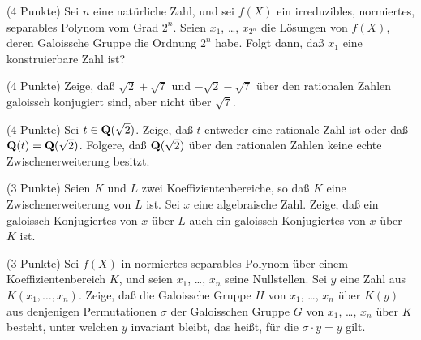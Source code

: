 \documentclass{algsheet}
\begin{document}
\begin{exercise}(4 Punkte)\newline
    Sei \(n\) eine natürliche Zahl,
    und sei \(f(X)\) ein irreduzibles, normiertes, separables Polynom vom Grad \(2^n\).
    Seien \(x_1\), \dots, \(x_{2^n}\) die Lösungen von \(f(X)\), deren
    Galoissche Gruppe die Ordnung \(2^n\) habe. Folgt dann, daß \(x_1\) eine konstruierbare
    Zahl ist?
\end{exercise}






\begin{exercise}(4 Punkte)\newline
    Zeige, daß \(\sqrt 2 + \sqrt 7\) und \(- \sqrt 2 - \sqrt 7\) über den rationalen Zahlen galoissch konjugiert
    sind, aber nicht über \(\sqrt 7\).
\end{exercise}

\begin{exercise}(4 Punkte)\newline
    Sei \(t \in \mathbf Q(\sqrt 2)\). Zeige, daß \(t\) entweder eine rationale
    Zahl ist oder daß \(\mathbf Q(t) = \mathbf Q(\sqrt 2)\). Folgere, daß \(\mathbf Q(\sqrt 2)\)
    über den rationalen Zahlen keine echte Zwischenerweiterung besitzt.
\end{exercise}

\begin{exercise}(3 Punkte)\newline
    Seien \(K\) und \(L\) zwei Koeffizientenbereiche, so daß \(K\) eine Zwischenerweiterung
    von \(L\) ist. Sei \(x\) eine algebraische Zahl. Zeige, daß ein galoissch Konjugiertes
    von \(x\) über \(L\) auch ein galoissch Konjugiertes von \(x\) über \(K\)
    ist.
\end{exercise}

\begin{exercise}(3 Punkte)\newline
    Sei \(f(X)\) in normiertes separables Polynom über einem Koeffizientenbereich \(K\), und
    seien \(x_1\), \dots, \(x_n\) seine Nullstellen. Sei \(y\) eine Zahl aus \(K(x_1, \dotsc, x_n)\).
    Zeige, daß die Galoissche Gruppe \(H\) von \(x_1\), \dots, \(x_n\) über \(K(y)\) aus denjenigen
    Permutationen \(\sigma\)
    der Galoisschen Gruppe \(G\) von \(x_1\), \dots, \(x_n\) über \(K\) besteht, unter welchen \(y\) invariant
    bleibt, das heißt, für die \(\sigma \cdot y = y\) gilt.
\end{exercise}
\end{document}
